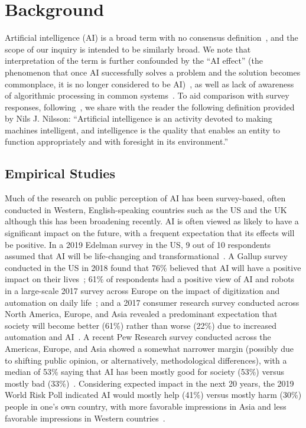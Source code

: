 \documentclass[11pt]{article} %
\begin{document}
\section{Background}
Artificial intelligence (AI) is a broad term with no consensus definition~\cite{edelman2019, fast2017long, stone2016artificial},
and the scope of our inquiry is intended to be similarly broad.
We note that interpretation of the term is further confounded by the ``AI effect'' (the phenomenon that once AI successfully solves a problem and the solution becomes commonplace, it is no longer considered to be AI)~\cite{mccorduck2004machines}, as well as lack of awareness of algorithmic processing in common systems~\cite{eslami2015always, rader2015understanding, warshaw2016intuitions}. 
To aid comparison with survey responses,
following~\cite{stone2016artificial}, we share with the reader the following definition provided by Nils J. Nilsson: ``Artificial intelligence is an activity devoted to making machines intelligent, and intelligence is the quality that enables an entity to function appropriately and with foresight in its environment.''~\cite{nils2009}

\subsection{Empirical Studies}
Much of the research on public perception of AI has been survey-based, often conducted in Western, English-speaking countries such as the US and the UK~\cite{blumberg2019, cave2019, edelman2019, zhang2019artificial, northeastern2018} although this has been broadening recently.
AI is often viewed as likely to have a significant impact on the future, with a frequent expectation that its effects will be positive.
In a 2019 Edelman survey in the US, 9 out of 10 respondents assumed that AI will be life-changing and transformational~\cite{edelman2019}.
A Gallup survey conducted in the US in 2018 found that 76\% believed that AI will have a positive impact on their lives~\cite{northeastern2018}; 61\% of respondents had a positive view of AI and robots in a large-scale 2017 survey across Europe on the impact of digitization and automation on daily life~\cite{european2017}; and a 2017 consumer research survey conducted across North America, Europe, and Asia revealed a predominant expectation that society will become better (61\%) rather than worse (22\%) due to increased automation and AI~\cite{arm2017}. A recent Pew Research survey conducted across the Americas, Europe, and Asia showed a somewhat narrower margin (possibly due to shifting public opinion, or alternatively, methodological differences), with a median of 53\% saying that AI has been mostly good for society (53\%) versus mostly bad (33\%)~\cite{funk2020}. Considering expected impact in the next 20 years, the 2019 World Risk Poll indicated AI would mostly help (41\%) versus mostly harm (30\%) people in one's own country, with more favorable impressions in Asia and less favorable impressions in Western countries~\cite{lloyds2020, neudert2020}.
\end{document}
